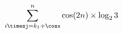 \documentclass[12pt,a4paper]{article}
\begin{document}
\begin{displaymath}

\sum_{i\timesj=k_1+\cosx}^n \cos (2n) \times \log_23 \\

\end{displaymath}


\end{document}
